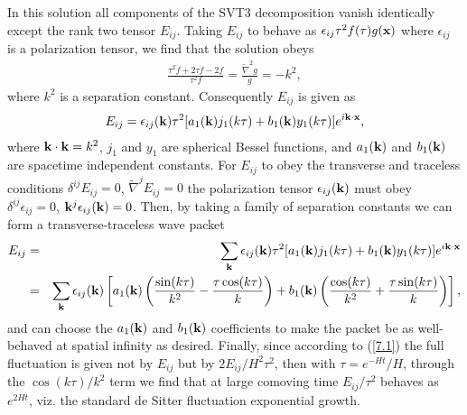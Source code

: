 \documentclass[aps,onecolumn,10pt]{revtex4}
\numberwithin{equation}{section}
\numberwithin{equation}{section}
\begin{document}
In this solution all components of the SVT3 decomposition vanish identically except the rank two tensor $E_{ij}$. Taking $E_{ij}$ to behave as $\epsilon_{ij}\tau^2f(\tau)g({\bf x})$ where $\epsilon_{ij}$ is a polarization tensor, we find that the solution obeys
%
\begin{eqnarray}
\frac{\tau^2 \ddot{f}+2\tau \dot{f}-2f}{\tau^2f}=\frac{\tilde{\nabla}^2g}{g}=-k^2,
\label{7.18}
\end{eqnarray}
%
where $k^2$ is a separation constant. Consequently $E_{ij}$ is given as
%
\begin{eqnarray}
E_{ij}=\epsilon_{ij}({\bf k})\tau^2[a_1({\bf k})j_1(k\tau)+b_1({\bf k})y_1(k\tau)]e^{i{\bf k}\cdot{\bf x}},
\label{7.19}
\end{eqnarray}
%
where ${\bf k}\cdot{\bf k}=k^2$, $j_1$ and $y_1$ are spherical Bessel functions, and $a_1({\bf k})$ and $b_1({\bf k})$ are spacetime independent constants. For $E_{ij}$ to obey the transverse and traceless conditions $\delta^{ij}E_{ij}=0$, $\tilde{\nabla}^jE_{ij}=0$ the polarization tensor $\epsilon_{ij}({\bf k})$ must obey $\delta^{ij}\epsilon_{ij}=0$, ${\bf k}^{j}\epsilon_{ij}({\bf k})=0$.
Then, by taking a family of separation constants we can form a transverse-traceless wave packet
%
\begin{eqnarray}
E_{ij}&=&\sum_{\bf k}\epsilon_{ij}({\bf k})\tau^2[a_1({\bf k})j_1(k\tau)+b_1({\bf k})y_1(k\tau)]e^{i{\bf k}\cdot{\bf x}}\nonumber\\
&=&
\sum_{\bf k}\epsilon_{ij}({\bf k})\left[a_1({\bf k})\left(\frac{\sin(k\tau)}{k^2}-\frac{\tau\cos(k\tau)}{k}\right)+b_1({\bf k})\left(\frac{\cos(k\tau)}{k^2}+\frac{\tau\sin(k\tau)}{k}\right)\right],
\label{7.20}
\end{eqnarray}
%
and can choose the $a_1({\bf k})$ and $b_1({\bf k})$ coefficients to make the packet be as well-behaved at spatial infinity as desired. Finally, since according to (\ref{7.1}) the full fluctuation is given not by $E_{ij}$ but by $2E_{ij}/H^2\tau^2$, then with $\tau=e^{-Ht}/H$, through the $\cos(k\tau)/k^2$ term we find that at large comoving time  $E_{ij}/\tau^2$ behaves as $e^{2Ht}$, viz. the standard de Sitter fluctuation exponential growth.
\end{document}
